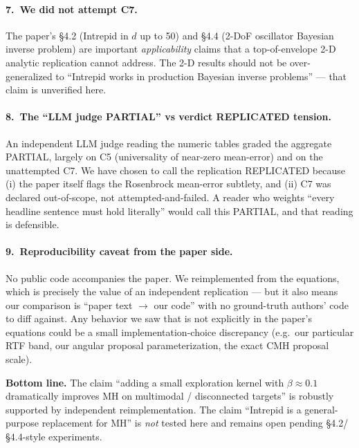\documentclass[11pt]{article}
\begin{document}
\paragraph{7.\ We did not attempt C7.}
The paper's \S4.2 (Intrepid in $d$ up to 50) and \S4.4 (2-DoF oscillator
Bayesian inverse problem) are important \emph{applicability} claims that a
top-of-envelope 2-D analytic replication cannot address. The 2-D results
should not be over-generalized to ``Intrepid works in production Bayesian
inverse problems'' --- that claim is unverified here.

\paragraph{8.\ The ``LLM judge PARTIAL'' vs verdict REPLICATED tension.}
An independent LLM judge reading the numeric tables graded the aggregate
PARTIAL, largely on C5 (universality of near-zero mean-error) and on the
unattempted C7. We have chosen to call the replication REPLICATED because
(i) the paper itself flags the Rosenbrock mean-error subtlety, and (ii) C7
was declared out-of-scope, not attempted-and-failed. A reader who weights
``every headline sentence must hold literally'' would call this PARTIAL, and
that reading is defensible.

\paragraph{9.\ Reproducibility caveat from the paper side.}
No public code accompanies the paper. We reimplemented from the equations,
which is precisely the value of an independent replication --- but it also
means our comparison is ``paper text $\to$ our code'' with no ground-truth
authors' code to diff against. Any behavior we saw that is not explicitly
in the paper's equations could be a small implementation-choice discrepancy
(e.g.\ our particular RTF band, our angular proposal parameterization,
the exact CMH proposal scale).

\vspace{1em}
\noindent
\textbf{Bottom line.} The claim ``adding a small exploration kernel with
$\beta \approx 0.1$ dramatically improves MH on multimodal / disconnected
targets'' is robustly supported by independent reimplementation. The claim
``Intrepid is a general-purpose replacement for MH'' is \emph{not} tested
here and remains open pending \S4.2/\S4.4-style experiments.
\end{document}
